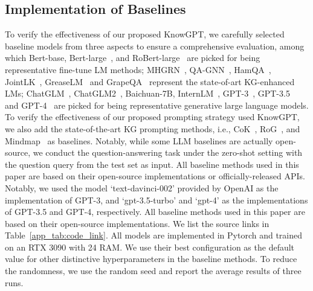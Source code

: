 \documentclass{article}
\theoremstyle{boldremark}
\begin{document}
\subsection{Implementation of Baselines }\label{appendix-sec:hardware-software-config}
To verify the effectiveness of our proposed KnowGPT, we carefully selected baseline models from three aspects to ensure a comprehensive evaluation, among which Bert-base, Bert-large~\cite{devlin2018bert}, and RoBert-large~\cite{liu2019roberta} are picked for being representative fine-tune LM methods; MHGRN~\cite{MHGRN}, QA-GNN~\cite{QA-GNN}, HamQA~\cite{dong2023hierarchy}, JointLK~\cite{sun2021jointlk}, GreaseLM~\cite{zhang2022greaselm} and GrapeQA~\cite{taunk2023grapeqa} represent the state-of-art KG-enhanced LMs; ChatGLM~\cite{du2022glm}, ChatGLM2~\cite{zeng2022glm}, Baichuan-7B, InternLM~\cite{team2023internlm}, GPT-3~\cite{NEURIPS2020_1457c0d6}, GPT-3.5~\cite{ouyang2022training} and GPT-4~\cite{openai2023gpt4} are picked for being representative generative large language models.  To verify the effectiveness of our proposed prompting strategy used KnowGPT, we also add the state-of-the-art KG prompting methods, i.e., CoK~\cite{wang2023boosting}, RoG~\cite{luo2023reasoning}, and Mindmap~\cite{wen2023mindmap} as baselines.  Notably, while some LLM baselines are actually open-source, we conduct the question-answering task under the zero-shot setting with the question query from the test set as input. All baseline methods used in this paper are based on their open-source implementations or officially-released APIs. Notably, we used the model ‘text-davinci-002’ provided by OpenAI as the implementation of GPT-3, and ‘gpt-3.5-turbo’ and ‘gpt-4’ as the implementations of GPT-3.5 and GPT-4, respectively. All baseline methods used in this paper are based on their open-source implementations. We list the source links in Table~\ref{app_tab:code_link}. All models are implemented in Pytorch and trained on an RTX 3090 with 24 RAM. We use their best configuration as the default value for other distinctive hyperparameters in the baseline methods. To reduce the randomness, we use the random seed and report the average results of three runs.
\end{document}
